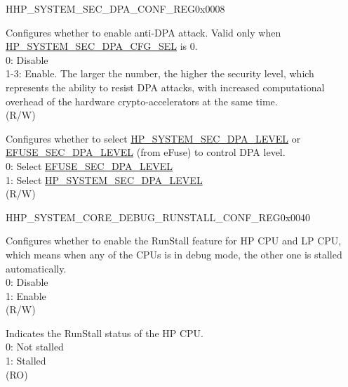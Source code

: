 \begin{register}{H}{HP\_SYSTEM\_SEC\_DPA\_CONF\_REG}{0x0008}\label{regdesc:HPSYSTEMSECDPACONFREG}
%
%
%
\regnewline%
\begin{regdesc}\begin{reglist}
\label{fielddesc:HPSYSTEMSECDPALEVEL}\item [HP\_SYSTEM\_SEC\_DPA\_LEVEL] Configures whether to enable anti-DPA attack. Valid only when \hyperref[fielddesc:HPSYSTEMSECDPACFGSEL]{HP\_SYSTEM\_SEC\_DPA\_CFG\_SEL} is 0. \\
0: Disable\\
1-3: Enable. The larger the number, the higher the security level, which represents the ability to resist DPA attacks, with increased computational overhead of the hardware crypto-accelerators at the same time. \\
(R/W)
\label{fielddesc:HPSYSTEMSECDPACFGSEL}\item [HP\_SYSTEM\_SEC\_DPA\_CFG\_SEL] Configures whether to select \hyperref[fielddesc:HPSYSTEMSECDPALEVEL]{HP\_SYSTEM\_SEC\_DPA\_LEVEL} or \hyperref[fielddesc:EFUSESECDPALEVEL]{EFUSE\_SEC\_DPA\_LEVEL} (from eFuse) to control DPA level. \\
0: Select \hyperref[fielddesc:EFUSESECDPALEVEL]{EFUSE\_SEC\_DPA\_LEVEL}\\
1: Select \hyperref[fielddesc:HPSYSTEMSECDPALEVEL]{HP\_SYSTEM\_SEC\_DPA\_LEVEL}\\
(R/W)
\end{reglist}\end{regdesc}
\end{register}


\begin{register}{H}{HP\_SYSTEM\_CORE\_DEBUG\_RUNSTALL\_CONF\_REG}{0x0040}\label{regdesc:HPSYSTEMCOREDEBUGRUNSTALLCONFREG}
%
%
%
\regnewline%
\begin{regdesc}\begin{reglist}
\label{fielddesc:HPSYSTEMCOREDEBUGRUNSTALLENABLE}\item [HP\_SYSTEM\_CORE\_DEBUG\_RUNSTALL\_ENABLE] Configures whether to enable the RunStall feature for HP CPU and LP CPU, which means when any of the CPUs is in debug mode, the other one is stalled automatically.\\
0: Disable\\
1: Enable\\
(R/W)
\label{fielddesc:HPSYSTEMCORERUNSTALLED}\item [HP\_SYSTEM\_CORE\_RUNSTALLED] Indicates the RunStall status of the HP CPU.\\
0: Not stalled\\
1: Stalled\\
(RO)
\end{reglist}\end{regdesc}
\end{register}


